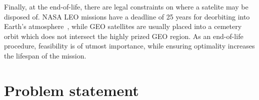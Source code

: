 Finally, at the end-of-life, there are legal constraints on where a satelite may be disposed of. NASA LEO missions have a deadline of 25 years for deorbiting into Earth's atmosphere~\cite{nasa_deorbit}, while GEO satellites are usually placed into a cemetery orbit which does not intersect the highly prized GEO region. As an end-of-life procedure, feasibility is of utmost importance, while ensuring optimality increases the lifespan of the mission.

\section{Problem statement}








